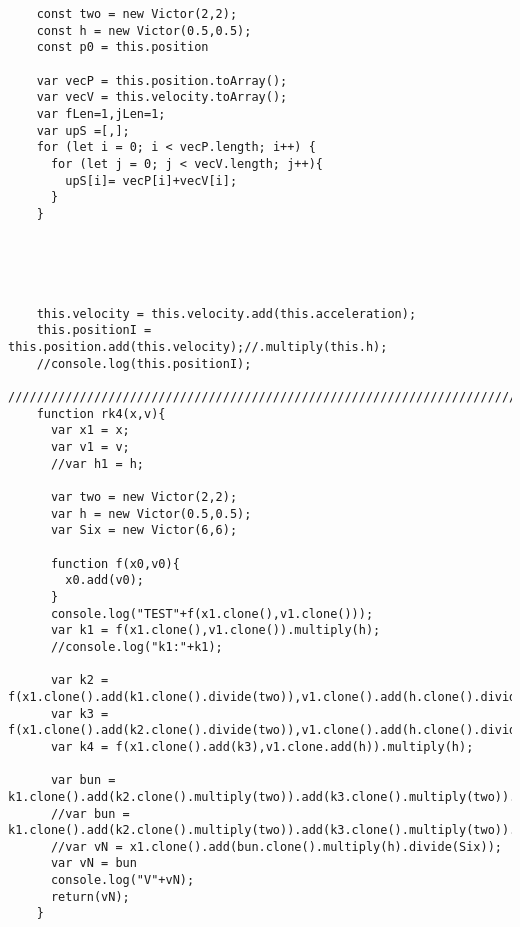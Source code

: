 \begin{lstlisting}
    const two = new Victor(2,2);
    const h = new Victor(0.5,0.5);
    const p0 = this.position

    var vecP = this.position.toArray();
    var vecV = this.velocity.toArray();
    var fLen=1,jLen=1;
    var upS =[,];
    for (let i = 0; i < vecP.length; i++) {
      for (let j = 0; j < vecV.length; j++){
        upS[i]= vecP[i]+vecV[i];
      }
    }
    




    this.velocity = this.velocity.add(this.acceleration);
    this.positionI = this.position.add(this.velocity);//.multiply(this.h);
    //console.log(this.positionI);
    //////////////////////////////////////////////////////////////////////////////////////////////////////////////////////
    function rk4(x,v){
      var x1 = x;
      var v1 = v;
      //var h1 = h;
      
      var two = new Victor(2,2);
      var h = new Victor(0.5,0.5);
      var Six = new Victor(6,6);

      function f(x0,v0){
        x0.add(v0);
      }
      console.log("TEST"+f(x1.clone(),v1.clone()));
      var k1 = f(x1.clone(),v1.clone()).multiply(h);
      //console.log("k1:"+k1);

      var k2 = f(x1.clone().add(k1.clone().divide(two)),v1.clone().add(h.clone().divide(two))).multiply(h);
      var k3 = f(x1.clone().add(k2.clone().divide(two)),v1.clone().add(h.clone().divide(two))).multiply(h);
      var k4 = f(x1.clone().add(k3),v1.clone.add(h)).multiply(h);
      
      var bun = k1.clone().add(k2.clone().multiply(two)).add(k3.clone().multiply(two)).add(k4).multiply(h).divide(Six);
      //var bun = k1.clone().add(k2.clone().multiply(two)).add(k3.clone().multiply(two)).add(k4).multiply(h);
      //var vN = x1.clone().add(bun.clone().multiply(h).divide(Six));
      var vN = bun
      console.log("V"+vN);
      return(vN);
    }


\end{lstlisting}
